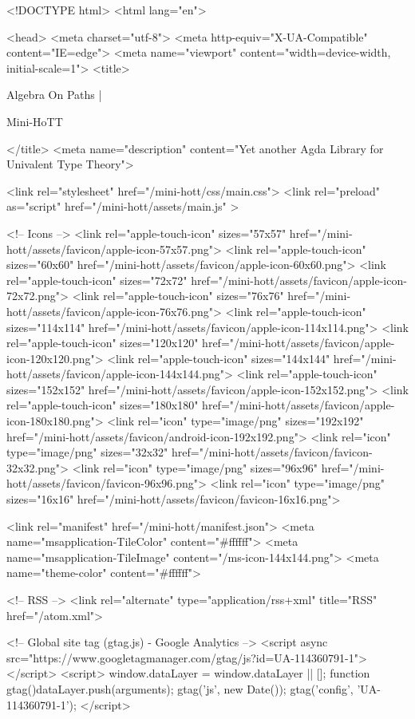 <!DOCTYPE html>
<html lang="en">

<head>
  <meta charset="utf-8">
  <meta http-equiv="X-UA-Compatible" content="IE=edge">
  <meta name="viewport" content="width=device-width, initial-scale=1">
  <title>
    
      
        Algebra On Paths |
      
        Mini-HoTT
    
  </title>
  <meta name="description" content="Yet another Agda Library for Univalent Type Theory">

  <link rel="stylesheet" href="/mini-hott/css/main.css">
  <link rel="preload" as="script" href="/mini-hott/assets/main.js" >

  <!-- Icons -->
  <link rel="apple-touch-icon" sizes="57x57" href="/mini-hott/assets/favicon/apple-icon-57x57.png">
  <link rel="apple-touch-icon" sizes="60x60" href="/mini-hott/assets/favicon/apple-icon-60x60.png">
  <link rel="apple-touch-icon" sizes="72x72" href="/mini-hott/assets/favicon/apple-icon-72x72.png">
  <link rel="apple-touch-icon" sizes="76x76" href="/mini-hott/assets/favicon/apple-icon-76x76.png">
  <link rel="apple-touch-icon" sizes="114x114" href="/mini-hott/assets/favicon/apple-icon-114x114.png">
  <link rel="apple-touch-icon" sizes="120x120" href="/mini-hott/assets/favicon/apple-icon-120x120.png">
  <link rel="apple-touch-icon" sizes="144x144" href="/mini-hott/assets/favicon/apple-icon-144x144.png">
  <link rel="apple-touch-icon" sizes="152x152" href="/mini-hott/assets/favicon/apple-icon-152x152.png">
  <link rel="apple-touch-icon" sizes="180x180" href="/mini-hott/assets/favicon/apple-icon-180x180.png">
  <link rel="icon" type="image/png" sizes="192x192"  href="/mini-hott/assets/favicon/android-icon-192x192.png">
  <link rel="icon" type="image/png" sizes="32x32" href="/mini-hott/assets/favicon/favicon-32x32.png">
  <link rel="icon" type="image/png" sizes="96x96" href="/mini-hott/assets/favicon/favicon-96x96.png">
  <link rel="icon" type="image/png" sizes="16x16" href="/mini-hott/assets/favicon/favicon-16x16.png">

  <link rel="manifest" href="/mini-hott/manifest.json">
  <meta name="msapplication-TileColor" content="#ffffff">
  <meta name="msapplication-TileImage" content="/ms-icon-144x144.png">
  <meta name="theme-color" content="#ffffff">

  <!-- RSS -->
  <link rel="alternate" type="application/rss+xml" title="RSS" href="/atom.xml">

  <!-- Global site tag (gtag.js) - Google Analytics -->
  <script async src="https://www.googletagmanager.com/gtag/js?id=UA-114360791-1"></script>
  <script>
    window.dataLayer = window.dataLayer || [];
    function gtag(){dataLayer.push(arguments);}
    gtag('js', new Date());
    gtag('config', 'UA-114360791-1');
  </script>

